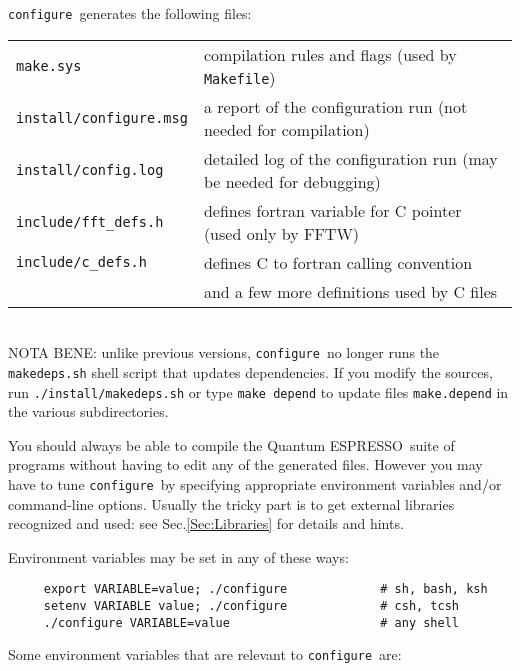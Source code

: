 \documentclass[12pt,a4paper]{article}
\def\qe{{\sc Quantum ESPRESSO}}
\def\configure{\texttt{configure}}
\begin{document}
\noindent \configure\ generates the following files:

\begin{tabular}{ll}
\texttt{make.sys} &      compilation rules and flags (used by \texttt{Makefile})\\
\texttt{install/configure.msg} & a report of the configuration run (not needed for compilation)\\
\texttt{install/config.log} & detailed log of the configuration run (may be needed for debugging)\\
\texttt{include/fft\_defs.h} &    defines fortran variable for C pointer (used only by FFTW)\\
\texttt{include/c\_defs.h} &      defines C to fortran calling convention\\
                           & and a few more definitions used by C files\\
\end{tabular}\\
NOTA BENE: unlike previous versions, \configure\ no longer runs the 
\texttt{makedeps.sh} shell script that updates dependencies. If you modify the  
sources, run \texttt{./install/makedeps.sh} or type \texttt{make depend}
to update files \texttt{make.depend} in the various subdirectories.
    
You should always be able to compile the \qe\ suite
of programs without having to edit any of the generated files. However you
may have to tune \configure\ by specifying appropriate environment variables
and/or command-line options. Usually the tricky part is to get external
libraries recognized and used: see Sec.\ref{Sec:Libraries}
for details and hints.

Environment variables may be set in any of these ways:
\begin{verbatim}
     export VARIABLE=value; ./configure             # sh, bash, ksh
     setenv VARIABLE value; ./configure             # csh, tcsh
     ./configure VARIABLE=value                     # any shell
\end{verbatim}
Some environment variables that are relevant to \configure\ are:
\end{document}
